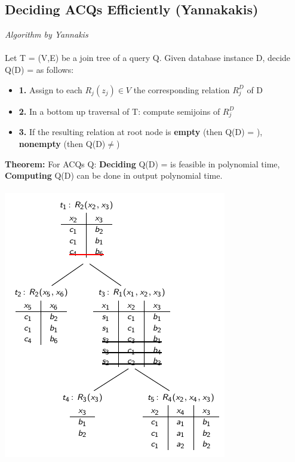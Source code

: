 \documentclass{article}
\begin{document}
\subsection{Deciding ACQs Efficiently (Yannakakis)}
\textit{Algorithm by Yannakis}\\\\
Let T = (V,E) be a join tree of a query Q. Given database instance D, decide Q(D) = \empty as follows:\\
\begin{itemize}
\item \textbf{1. }Assign to each $R_j(z_j)\in V$ the corresponding relation $R_j^D$ of D
\item \textbf{2. }In a bottom up traversal of T: compute semijoins of $R_j^D$
\item \textbf{3. }If the resulting relation at root node is \textbf{empty} (then Q(D) = \empty), \textbf{nonempty} (then Q(D)$\neq$)\\
\end{itemize}
\textbf{Theorem: }For ACQs Q: \textbf{Deciding} Q(D) = \empty is feasible in polynomial time, \textbf{Computing} Q(D) can be done in output polynomial time.\\\\
\includegraphics[scale=0.6]{74.png}\\\\
\end{document}
